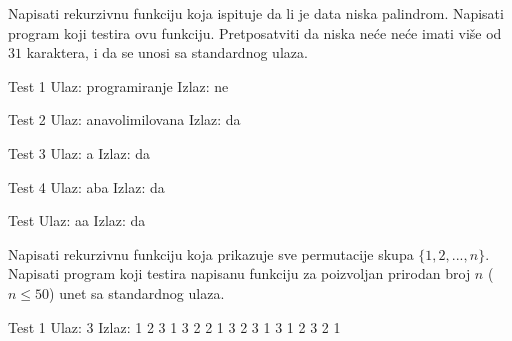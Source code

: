 \begin{Exercise}[label=113]
Napisati rekurzivnu funkciju  koja ispituje da li je data niska
  palindrom. Napisati program koji testira ovu funkciju. Pretposatviti
  da niska neće neće imati više od $31$ karaktera, i da se unosi sa standardnog
  ulaza.
  
\begin{miditest}
\begin{test}{Test 1}
Ulaz:    programiranje    
Izlaz:   ne                   
\end{test}
\end{miditest}
\begin{miditest}
\begin{test}{Test 2}
Ulaz:    anavolimilovana 
Izlaz:   da                   
\end{test}
\end{miditest}

\begin{minitest}
\begin{test}{Test 3}
Ulaz:    a        
Izlaz:   da 
\end{test}
\end{minitest}
\begin{minitest}
\begin{test}{Test 4}
Ulaz:    aba   
Izlaz:   da 
\end{test}
\end{minitest}
\begin{minitest}
\begin{test}{Test }
Ulaz:    aa
Izlaz:   da 
\end{test}
\end{minitest}

\end{Exercise}
\begin{Answer}[ref=113]
\end{Answer}



\begin{Exercise}[label=107, difficulty=1]
Napisati rekurzivnu funkciju koja prikazuje sve permutacije skupa $\{1, 2, ... ,n\}$. Napisati program koji testira napisanu funkciju za poizvoljan prirodan broj $n$ ($n \le 50$) unet sa standardnog ulaza.

\begin{minitest}
\begin{test}{Test 1}
Ulaz:   3
Izlaz:  1 2 3
        1 3 2
        2 1 3
        2 3 1
        3 1 2
        3 2 1
\end{test}
\end{minitest}

\end{Exercise}
\begin{Answer}[ref=107]
\end{Answer}

